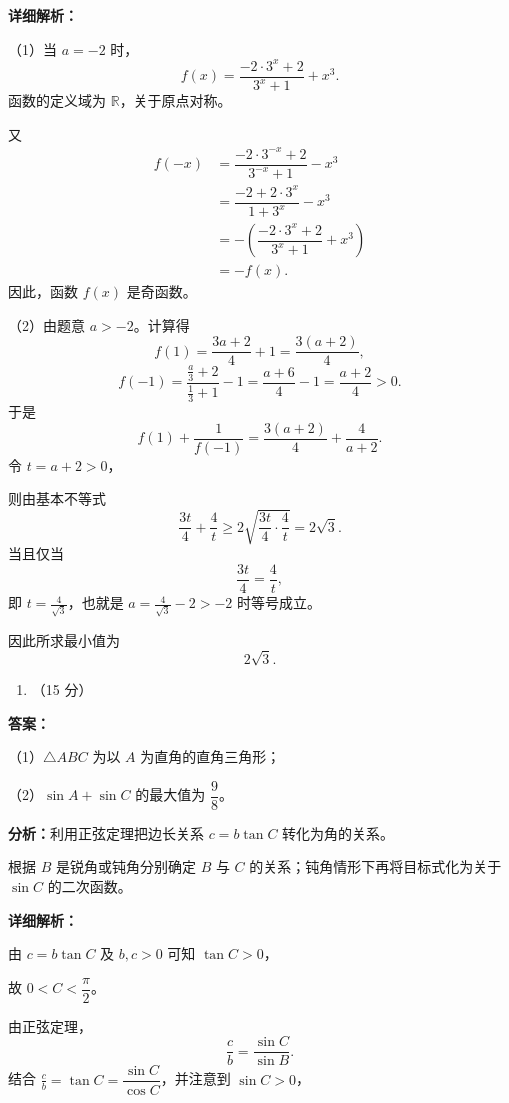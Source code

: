 \documentclass[UTF8,11pt,a4paper]{ctexart}
\providecommand{\tightlist}{%
  \setlength{\itemsep}{0pt}\setlength{\parskip}{0pt}}
\begin{document}
\textbf{详细解析：}


\par\smallskip\noindent（1）当 \(a=-2\) 时，
\[
   f(x)=\dfrac{-2\cdot 3^x+2}{3^x+1}+x^3.
   \]
函数的定义域为 \(\mathbb R\)，关于原点对称。

又
\[
   \begin{aligned}
   f(-x)
   &=\dfrac{-2\cdot 3^{-x}+2}{3^{-x}+1}-x^3\\
   &=\dfrac{-2+2\cdot 3^x}{1+3^x}-x^3\\
   &=-\left(\dfrac{-2\cdot 3^x+2}{3^x+1}+x^3\right)\\
   &=-f(x).
   \end{aligned}
   \]
因此，函数 \(f(x)\) 是奇函数。


\par\smallskip\noindent（2）由题意 \(a>-2\)。计算得
\[
   f(1)=\dfrac{3a+2}{4}+1=\dfrac{3(a+2)}4,
   \]
\[
   f(-1)=\dfrac{\frac a3+2}{\frac13+1}-1
   =\dfrac{a+6}{4}-1
   =\dfrac{a+2}{4}>0.
   \]
于是
\[
   f(1)+\frac1{f(-1)}
   =\dfrac{3(a+2)}4+\frac4{a+2}.
   \]
令 \(t=a+2>0\)，

则由基本不等式
\[
   \dfrac{3t}{4}+\frac4t
   \geqslant 2\sqrt{\dfrac{3t}{4}\cdot\frac4t}
   =2\sqrt3.
   \]
当且仅当
\[
   \dfrac{3t}{4}=\frac4t,
   \]
即 \(t=\frac4{\sqrt3}\)，也就是 \(a=\frac4{\sqrt3}-2>-2\) 时等号成立。

因此所求最小值为
\[
   \boxed{2\sqrt3}.
   \]

\begin{enumerate}
\def\labelenumi{\arabic{enumi}.}
\setcounter{enumi}{16}
\tightlist
\item
  （15 分）
\end{enumerate}

\textbf{答案：}
\par\smallskip\noindent（1）\(\triangle ABC\) 为以 \(A\) 为直角的直角三角形；
\par\smallskip\noindent（2）\(\sin A+\sin C\) 的最大值为 \(\dfrac98\)。

\textbf{分析：}利用正弦定理把边长关系 \(c=b\tan C\) 转化为角的关系。

根据 \(B\) 是锐角或钝角分别确定 \(B\) 与 \(C\) 的关系；钝角情形下再将目标式化为关于 \(\sin C\) 的二次函数。

\textbf{详细解析：}

由 \(c=b\tan C\) 及 \(b,c>0\) 可知 \(\tan C>0\)，

故 \(0<C<\dfrac{\pi}{2}\)。

由正弦定理，
\[
   \frac cb=\dfrac{\sin C}{\sin B}.
   \]
结合 \(\frac cb=\tan C=\dfrac{\sin C}{\cos C}\)，并注意到 \(\sin C>0\)，
\end{document}
